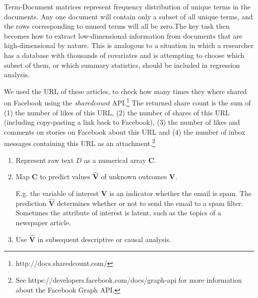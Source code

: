 \documentclass[12pt,a4paper,notitlepage]{article}
\begin{document}
Term-Document matrices represent frequency distribution of unique terms in the documents. Any one document will contain only a subset of all unique terms, and the rows corresponding to unused terms will all be zero.The key task then becomes how to extract low-dimensional information from documents that are high-dimensional by nature. This is analogous to a situation in which a researcher has a database with thousands of covariates and is attempting to choose which subset of them, or which summary statistics, should be included in regression analysis.

We used the URL of these articles, to check how many times they where shared on Facebook using the \textit{sharedcount} API.\footnote{http://docs.sharedcount.com/} The returned share count is the sum of (1) the number of likes of this URL, (2) the number of shares of this URL (including copy-pasting a link back to Facebook), (3) the number of likes and comments on stories on Facebook about this URL and (4) the number of inbox messages containing this URL as an attachment.\footnote{See https://developers.facebook.com/docs/graph-api for more information about the Facebook Graph API.}

\begin{enumerate}
	\item Represent raw text $D$ as a numerical array $\boldsymbol{C}$. 
	 
	\item Map $\boldsymbol{C}$ to predict values $\boldsymbol{\hat{V}}$ of unknown outcomes $\boldsymbol{V}$. 
	
	E.g. the variable of interest $\boldsymbol{V}$ is an indicator whether the email is spam. The prediction $\boldsymbol{\hat{V}}$ determines whether or not to send the email to a spam filter. Sometimes the attribute of interest is latent, such as the topics of a newspaper article.
	\item Use $\boldsymbol{\hat{V}}$ in subsequent descriptive or causal analysis.
\end{enumerate}
\end{document}
